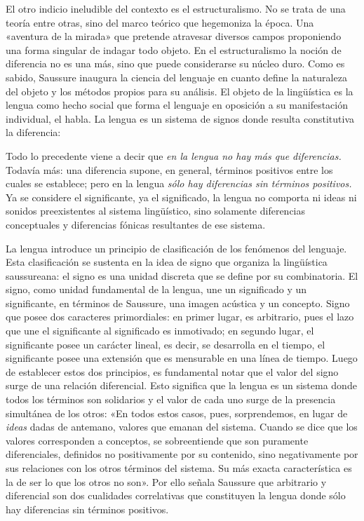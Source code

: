 El otro indicio ineludible del contexto es el estructuralismo. No se trata de una teoría entre otras, sino del marco teórico que hegemoniza la época. Una «aventura de la mirada» que pretende atravesar diversos campos proponiendo una forma singular de indagar todo objeto. En el estructuralismo la noción de diferencia no es una más, sino que puede considerarse su núcleo duro. Como es sabido, Saussure inaugura la ciencia del lenguaje en cuanto define la naturaleza del objeto y los métodos propios para su análisis. El objeto de la lingüística es la lengua como hecho social que forma el lenguaje en oposición a su manifestación individual, el habla. La lengua es un sistema de signos donde resulta constitutiva la diferencia:

Todo lo precedente viene a decir que \emph{en la lengua no hay más que diferencias. }Todavía más: una diferencia supone, en general, términos positivos entre los cuales se establece; pero en la lengua \emph{sólo hay diferencias sin términos positivos. }Ya se considere el significante, ya el significado, la lengua no comporta ni ideas ni sonidos preexistentes al sistema lingüístico, sino solamente diferencias conceptuales y diferencias fónicas resultantes de ese sistema.

La lengua introduce un principio de clasificación de los fenómenos del lenguaje. Esta clasificación se sustenta en la idea de signo que organiza la lingüística saussureana: el signo es una unidad discreta que se define por su combinatoria. El signo, como unidad fundamental de la lengua, une un significado y un significante, en términos de Saussure, una imagen acústica y un concepto. Signo que posee dos caracteres primordiales: en primer lugar, es arbitrario, pues el lazo que une el significante al significado es inmotivado; en segundo lugar, el significante posee un carácter lineal, es decir, se desarrolla en el tiempo, el significante posee una extensión que es mensurable en una línea de tiempo. Luego de establecer estos dos principios, es fundamental notar que el valor del signo surge de una relación diferencial. Esto significa que la lengua es un sistema donde todos los términos son solidarios y el valor de cada uno surge de la presencia simultánea de los otros: «En todos estos casos, pues, sorprendemos, en lugar de \emph{ideas} dadas de antemano, valores que emanan del sistema. Cuando se dice que los valores corresponden a conceptos, se sobreentiende que son puramente diferenciales, definidos no positivamente por su contenido, sino negativamente por sus relaciones con los otros términos del sistema. Su más exacta característica es la de ser lo que los otros no son». Por ello señala Saussure que arbitrario y diferencial son dos cualidades correlativas que constituyen la lengua donde sólo hay diferencias sin términos positivos.

